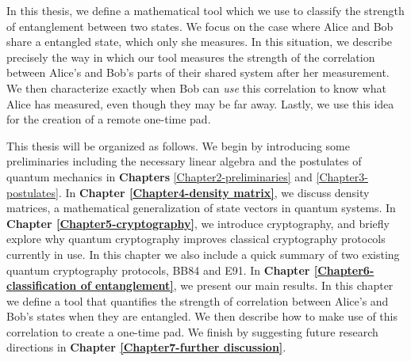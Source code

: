 In this thesis, we define a mathematical tool which we use to classify the strength of entanglement between two states. We focus on the case where Alice and Bob share a entangled state, which only she measures.  In this situation, we describe precisely the way in which our tool measures the strength of the correlation between Alice's and Bob's parts of their shared system after her measurement. We then characterize exactly when Bob can {\emph{use}} this correlation to know what Alice has measured, even though they may be far away.  Lastly, we use this idea for the creation of a remote one-time pad.



This thesis will be organized as follows.  We begin by introducing some preliminaries including the necessary linear algebra and the postulates of quantum mechanics in \textbf{Chapters} \ref{Chapter2-preliminaries} and  \ref{Chapter3-postulates}. In \textbf{Chapter \ref{Chapter4-density matrix}}, we discuss density matrices, a mathematical generalization of state vectors in quantum systems. In \textbf{Chapter \ref{Chapter5-cryptography}}, we introduce cryptography, and briefly explore why quantum cryptography improves classical cryptography protocols currently in use.  In this chapter we also include a quick summary of two existing quantum cryptography protocols, BB84 and E91. In \textbf{Chapter \ref{Chapter6-classification of entanglement}}, we present our main results.  In this chapter we define a tool that quantifies the strength of correlation between Alice's and Bob's states when they are entangled. We then describe how to make use of this correlation to create a one-time pad.  We finish by suggesting future research directions in \textbf{Chapter \ref{Chapter7-further discussion}}.


